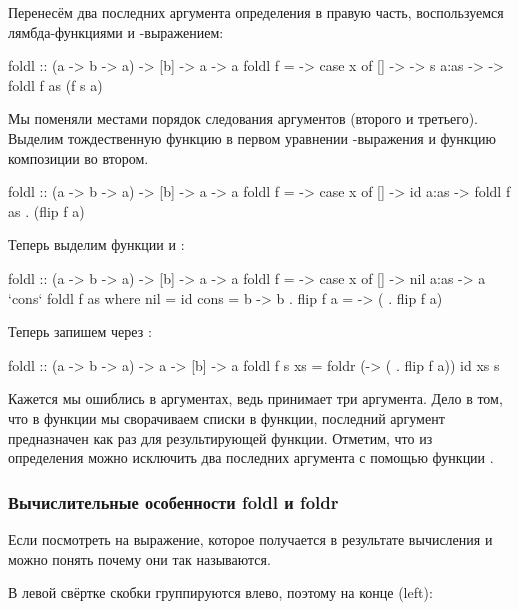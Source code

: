 Перенесём два последних аргумента определения
 в правую часть, воспользуемся
лямбда-функциями и -выражением:

\begin{code}
foldl :: (a -> b -> a) -> [b] -> a -> a
foldl f = \x -> case x of    
    []      -> \s -> s
    a:as    -> \s -> foldl f as (f s a)
\end{code}

Мы поменяли местами порядок следования аргументов
(второго и третьего). Выделим тождественную функцию 
в первом уравнении -выражения и функцию
композиции во втором. 


\begin{code}
foldl :: (a -> b -> a) -> [b] -> a -> a
foldl f = \x -> case x of    
    []      -> id
    a:as    -> foldl f as . (flip f a)
\end{code}

Теперь выделим функции  и :

\begin{code}
foldl :: (a -> b -> a) -> [b] -> a -> a
foldl f = \x -> case x of    
    []      -> nil 
    a:as    -> a `cons` foldl f as 
    where nil   = id
          cons  = \a b -> b . flip f a
                = \a   -> ( . flip f a)
\end{code}

Теперь запишем через :

\begin{code}
foldl :: (a -> b -> a) -> a -> [b] -> a
foldl f s xs = foldr (\a -> ( . flip f a)) id xs s
\end{code}

Кажется мы ошиблись в аргументах, ведь 
принимает три аргумента. Дело в том, что в функции
 мы сворачиваем списки в функции, последний
аргумент предназначен как раз для результирующей функции.
Отметим, что из определения можно исключить два последних
аргумента с помощью функции . 

\subsubsection{Вычислительные особенности foldl и foldr}

Если посмотреть на выражение, которое получается в 
результате вычисления  и  можно
понять почему они так называются. 

В левой свёртке  скобки группируются влево, поэтому 
на конце  (left):

